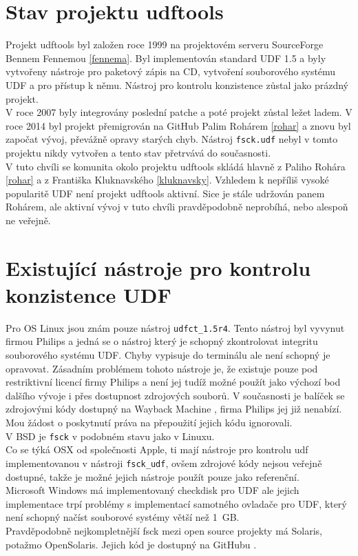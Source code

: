 \section{Stav projektu udftools}
Projekt udftools byl založen roce 1999 na projektovém serveru SourceForge \cite{udftools-sourceforge} Bennem Fennemou \ref{fennema}. Byl implementován standard UDF 1.5 a byly vytvořeny nástroje pro paketový zápis na CD, vytvoření souborového systému UDF a pro přístup k němu. Nástroj pro kontrolu konzistence zůstal jako prázdný projekt.\\
V roce 2007 byly integrovány poslední patche a poté projekt zůstal ležet ladem. V roce 2014 byl projekt přemigrován na GitHub \cite{udftools-github} Palim Rohárem \ref{rohar} a znovu byl započat vývoj, převážně opravy starých chyb. Nástroj \texttt{fsck.udf} nebyl v tomto projektu nikdy vytvořen a tento stav přetrvává do současnosti.\\
V tuto chvíli se komunita okolo projektu udftools skládá hlavně z Paliho Rohára \ref{rohar} a z Františka Kluknavského \ref{kluknavsky}. Vzhledem k nepříliš vysoké popularitě UDF není projekt udftools aktivní. Sice je stále udržován panem Rohárem, ale aktivní vývoj v tuto chvíli pravděpodobně neprobíhá, nebo alespoň ne veřejně.

\section{Existující nástroje pro kontrolu konzistence UDF}
Pro OS Linux jsou znám pouze nástroj \texttt{udfct\_1.5r4}. Tento nástroj byl vyvynut firmou Philips a jedná se o nástroj který je schopný zkontrolovat integritu souborového systému UDF. Chyby vypisuje do terminálu ale není schopný je opravovat. Zásadním problémem tohoto nástroje je, že existuje pouze pod restriktivní licencí firmy Philips a není jej tudíž možné použít jako výchozí bod dalšího vývoje i přes dostupnost zdrojových souborů. V současnosti je balíček se zdrojovými kódy dostupný na Wayback Machine \cite{wayback}, firma Philips jej již nenabízí. Mou žádost o poskytnutí práva na přepoužití jejich kódu ignorovali.\\
V BSD je \texttt{fsck} v podobném stavu jako v Linuxu. \\
Co se týká OSX od společnosti Apple, ti mají nástroje pro kontrolu udf implementovanou v nástroji \texttt{fsck\_udf}, ovšem zdrojové kódy nejsou veřejně dostupné, takže je možné jejich nástroje použít pouze jako referenční.\\
Microsoft Windows má implementovaný checkdisk pro UDF ale jejich implementace trpí problémy s implementací samotného ovladače pro UDF, který není schopný načíst souborové systémy větší než 1~GB.\\
Pravděpodobně nejkompletnější fsck mezi open source projekty má Solaris, potažmo OpenSolaris. Jejich kód je dostupný na GitHubu \cite{solaris-github}. 

 
